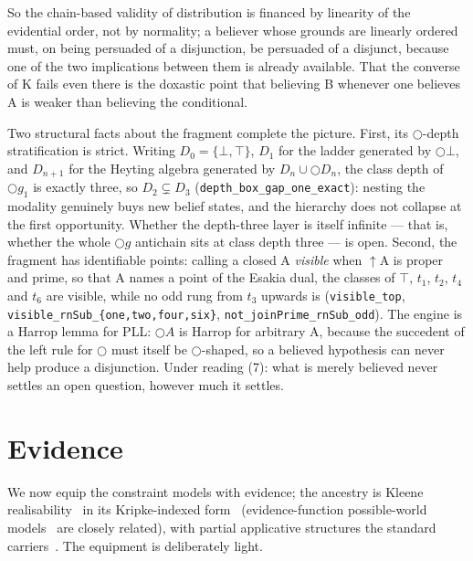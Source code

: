 So the chain-based validity of distribution is financed by linearity of
the evidential order, not by normality; a believer whose grounds are
linearly ordered must, on being persuaded of a disjunction, be
persuaded of a disjunct, because one of the two implications between
them is already available. That the converse of K fails even there is
the doxastic point that believing B whenever one believes A is weaker
than believing the conditional.

Two structural facts about the fragment complete the picture. First, its
\ensuremath{\bigcirc}-depth stratification is strict. Writing
\ensuremath{D_{0} = \{\bot, \top\}}, \ensuremath{D_{1}} for the ladder
generated by \ensuremath{\bigcirc\bot}, and \ensuremath{D_{n+1}} for the
Heyting algebra generated by
\ensuremath{D_{n} \cup \bigcirc D_{n}}, the class depth of
\ensuremath{\bigcirc g_{1}} is exactly three, so
\ensuremath{D_{2} \subsetneq D_{3}}
(\texttt{depth\_box\_gap\_one\_exact}): nesting the modality genuinely
buys new belief states, and the hierarchy does not collapse at the first
opportunity. Whether the depth-three layer is itself infinite --- that
is, whether the whole \ensuremath{\bigcirc g} antichain sits at class
depth three --- is open. Second, the fragment has identifiable points:
calling a closed A \emph{visible} when \ensuremath{\uparrow}A is proper
and prime, so that A names a point of the Esakia dual, the classes of
\ensuremath{\top}, \ensuremath{t_{1}}, \ensuremath{t_{2}},
\ensuremath{t_{4}} and \ensuremath{t_{6}} are visible, while no odd rung
from \ensuremath{t_{3}} upwards is (\texttt{visible\_top},
\texttt{visible\_rnSub\_\{one,two,four,six\}},
\texttt{not\_joinPrime\_rnSub\_odd}). The engine is a Harrop lemma for
PLL: \ensuremath{\bigcirc A} is Harrop for arbitrary A, because the
succedent of the left rule for \ensuremath{\bigcirc} must itself be
\ensuremath{\bigcirc}-shaped, so a believed hypothesis can never help
produce a disjunction. Under reading (7): what is merely believed never
settles an open question, however much it settles.

\section{Evidence}\label{4-evidence}

We now equip the constraint models with evidence; the ancestry is
Kleene realisability~\cite{Kleene1945,Troelstra1973,Troelstra1998,
TroelstraVanDalen1988} in its Kripke-indexed form~\cite{Lipton1992}
(evidence-function possible-world
models~\cite{Fitting2005,MarinPadhiarShillito2026} are closely
related), with partial applicative
structures the standard carriers~\cite{VanOosten2008}. The equipment
is deliberately light.

